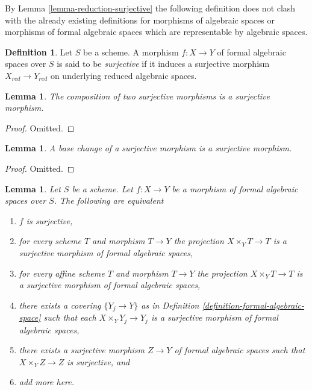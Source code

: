\documentclass{stacks-project}
\theoremstyle{plain}
\newtheorem{lemma}[subsection]{Lemma}
\theoremstyle{definition}
\newtheorem{definition}[subsection]{Definition}
\theoremstyle{remark}
\numberwithin{equation}{subsection}
\begin{document}
\noindent
By Lemma \ref{lemma-reduction-surjective} the following definition does
not clash with the already existing definitions for morphisms of algebraic
spaces or morphisms of formal algebraic spaces which are representable
by algebraic spaces.

\begin{definition}
\label{definition-surjective}
Let $S$ be a scheme. A morphism $f : X \to Y$ of formal algebraic spaces
over $S$ is said to be {\it surjective} if it induces a surjective morphism
$X_{red} \to Y_{red}$ on underlying reduced algebraic spaces.
\end{definition}

\begin{lemma}
\label{lemma-composition-surjective}
The composition of two surjective morphisms is a surjective morphism.
\end{lemma}

\begin{proof}
Omitted.
\end{proof}

\begin{lemma}
\label{lemma-base-change-surjective}
A base change of a surjective morphism is a surjective morphism.
\end{lemma}

\begin{proof}
Omitted.
\end{proof}

\begin{lemma}
\label{lemma-characterize-surjective}
Let $S$ be a scheme. Let $f : X \to Y$ be a morphism of formal algebraic
spaces over $S$. The following are equivalent
\begin{enumerate}
\item $f$ is surjective,
\item for every scheme $T$ and morphism $T \to Y$
the projection $X \times_Y T \to T$ is a surjective morphism
of formal algebraic spaces,
\item for every affine scheme $T$ and morphism $T \to Y$
the projection $X \times_Y T \to T$ is a surjective morphism of formal
algebraic spaces,
\item there exists a covering $\{Y_j \to Y\}$ as in
Definition \ref{definition-formal-algebraic-space}
such that each $X \times_Y Y_j \to Y_j$ is a surjective morphism of
formal algebraic spaces,
\item there exists a surjective morphism $Z \to Y$
of formal algebraic spaces such that $X \times_Y Z \to Z$ is surjective, and
\item add more here.
\end{enumerate}
\end{lemma}
\end{document}
